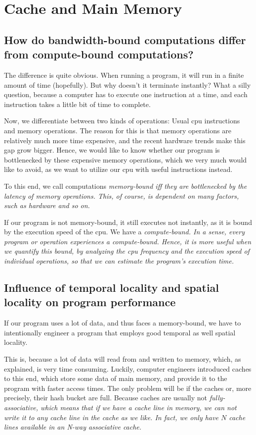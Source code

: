 \documentclass[../../main.tex]{subfiles}
\begin{document}
\section{Cache and Main Memory}
\subsection{How do bandwidth-bound computations differ from
compute-bound computations?}
The difference is quite obvious. When running a program, it will run in a finite amount of time (hopefully). But why doesn't it terminate instantly? What a silly question, because a computer has to execute one instruction at a time, and each instruction takes a little bit of time to complete.

Now, we differentiate between two kinds of operations: Usual cpu instructions and memory operations. The reason for this is that memory operations are relatively much more time expensive, and the recent hardware trends make this gap grow bigger. Hence, we would like to know whether our program is bottlenecked by these expensive memory operations, which we very much would like to avoid, as we want to utilize our cpu with useful instructions instead.

To this end, we call computations \em memory-bound \em iff they are bottlenecked by the latency of memory operations. This, of course, is dependent on many factors, such as hardware and so on.

If our program is not memory-bound, it still executes not instantly, as it is bound by the execution speed of the cpu. We have a \em compute-bound\em . In a sense, every program or operation experiences a compute-bound. Hence, it is more useful when we quantify this bound, by analyzing the cpu frequency and the execution speed of individual operations, so that we can estimate the program's execution time.

\bigskip
\subsection{Influence of temporal locality and spatial locality on program performance}
If our program uses a lot of data, and thus faces a memory-bound, we have to intentionally engineer a program that employs good temporal as well spatial locality.

This is, because a lot of data will read from and written to memory, which, as explained, is very time consuming. Luckily, computer engineers introduced caches to this end, which store some data of main memory, and provide it to the program with faster access times. The only problem will be if the caches or, more precisely, their hash bucket are full. Because caches are usually not \em fully-associative\em , which means that if we have a cache line in memory, we can not write it to any cache line in the cache as we like. In fact, we only have $N$ cache lines available in an \em N-way associative \em cache.
\end{document}
